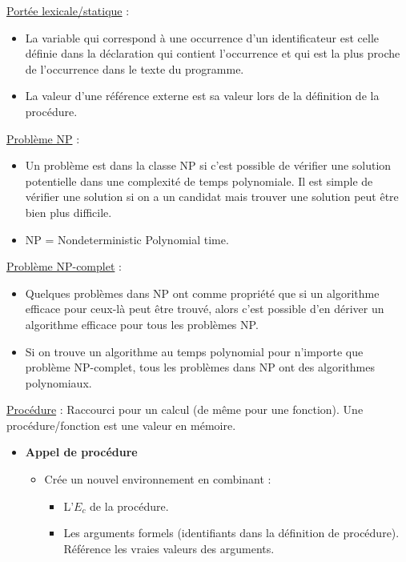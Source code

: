 \documentclass[fr,license=none,skiptoc]{../../../eplsummary}
\begin{document}
\begin{flushleft}
\textcolor{mauvedef}{\underline{Portée lexicale/statique}} :

\begin{itemize}
\item La variable qui correspond à une occurrence d’un identificateur est celle définie dans la déclaration qui contient l’occurrence et qui est la plus proche de l’occurrence dans le texte du programme.
\item La valeur d’une référence externe est sa valeur lors de la définition de la procédure.
\end{itemize}\bigbreak

\textcolor{mauvedef}{\underline{Problème NP}} :
\begin{itemize}
\item Un problème est dans la classe NP si c'est possible de vérifier une solution potentielle dans une complexité de temps polynomiale. Il est simple de vérifier une solution si on a un candidat mais trouver une solution peut être bien plus difficile. 
\item NP = Nondeterministic Polynomial time.
\end{itemize}
\bigbreak

\textcolor{mauvedef}{\underline{Problème NP-complet}} :
\begin{itemize}
\item Quelques problèmes dans NP ont comme propriété que si un algorithme efficace pour ceux-là peut être trouvé, alors c'est possible d'en dériver un algorithme efficace pour tous les problèmes NP.
\item Si on trouve un algorithme au temps polynomial pour n'importe que problème NP-complet, tous les problèmes dans NP ont des algorithmes polynomiaux.
\end{itemize}
\bigbreak



\textcolor{mauvedef}{\underline{Procédure}} : Raccourci pour un calcul (de même pour une fonction). Une procédure/fonction est une valeur en mémoire.
\begin{itemize}
\item \textbf{Appel de procédure}
\begin{itemize} [label=\textbullet, font=\MEDIUM]
\item Crée un nouvel environnement en combinant :
\begin{itemize} [label=\circ]
\item L'\textcolor{miorangerouge}{$E_c$} de la procédure.
\item Les arguments formels (identifiants dans la définition de procédure). Référence les vraies valeurs des arguments.
\end{itemize}


\end{itemize}
\end{itemize}
\end{flushleft}
\end{document}
